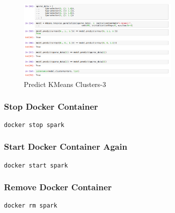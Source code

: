 \begin{figure}[htbp]
\centering
\includegraphics[width=0.7\textwidth]{images/docker-spark-tut-3.png}
\caption{Predict KMeans Clusters-3}
\end{figure}

\subsubsection{Stop Docker Container}

\begin{lstlisting}
docker stop spark
\end{lstlisting}

\subsubsection{Start Docker Container
Again}

\begin{lstlisting}
docker start spark
\end{lstlisting}

\subsubsection{Remove Docker Container}

\begin{lstlisting}
docker rm spark
\end{lstlisting}